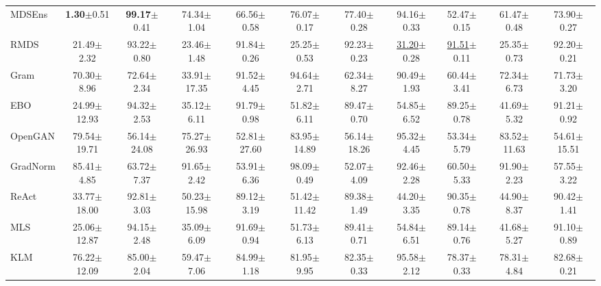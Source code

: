 \documentclass{article} \usepackage{iclr2024_conference,times}
\begin{document}
\begin{table*}[h]
{\begin{tabular}{l cc cc cc cc cc}
			MDSEns & \textbf{1.30}{\tiny$\pm$0.51} & \textbf{99.17}{\tiny$\pm$0.41} & 74.34{\tiny$\pm$1.04} & 66.56{\tiny$\pm$0.58} & 76.07{\tiny$\pm$0.17} & 77.40{\tiny$\pm$0.28} & 94.16{\tiny$\pm$0.33} & 52.47{\tiny$\pm$0.15} & 61.47{\tiny$\pm$0.48} & 73.90{\tiny$\pm$0.27} \\ 
			RMDS & 21.49{\tiny$\pm$2.32} & 93.22{\tiny$\pm$0.80} & 23.46{\tiny$\pm$1.48} & 91.84{\tiny$\pm$0.26} & 25.25{\tiny$\pm$0.53} & 92.23{\tiny$\pm$0.23} & \underline{31.20}{\tiny$\pm$0.28} & \underline{91.51}{\tiny$\pm$0.11} & 25.35{\tiny$\pm$0.73} & 92.20{\tiny$\pm$0.21} \\ 
			Gram & 70.30{\tiny$\pm$8.96} & 72.64{\tiny$\pm$2.34} & 33.91{\tiny$\pm$17.35} & 91.52{\tiny$\pm$4.45} & 94.64{\tiny$\pm$2.71} & 62.34{\tiny$\pm$8.27} & 90.49{\tiny$\pm$1.93} & 60.44{\tiny$\pm$3.41} & 72.34{\tiny$\pm$6.73} & 71.73{\tiny$\pm$3.20} \\ 
			EBO & 24.99{\tiny$\pm$12.93} & 94.32{\tiny$\pm$2.53} & 35.12{\tiny$\pm$6.11} & 91.79{\tiny$\pm$0.98} & 51.82{\tiny$\pm$6.11} & 89.47{\tiny$\pm$0.70} & 54.85{\tiny$\pm$6.52} & 89.25{\tiny$\pm$0.78} & 41.69{\tiny$\pm$5.32} & 91.21{\tiny$\pm$0.92} \\ 
			OpenGAN & 79.54{\tiny$\pm$19.71} & 56.14{\tiny$\pm$24.08} & 75.27{\tiny$\pm$26.93} & 52.81{\tiny$\pm$27.60} & 83.95{\tiny$\pm$14.89} & 56.14{\tiny$\pm$18.26} & 95.32{\tiny$\pm$4.45} & 53.34{\tiny$\pm$5.79} & 83.52{\tiny$\pm$11.63} & 54.61{\tiny$\pm$15.51} \\ 
			GradNorm & 85.41{\tiny$\pm$4.85} & 63.72{\tiny$\pm$7.37} & 91.65{\tiny$\pm$2.42} & 53.91{\tiny$\pm$6.36} & 98.09{\tiny$\pm$0.49} & 52.07{\tiny$\pm$4.09} & 92.46{\tiny$\pm$2.28} & 60.50{\tiny$\pm$5.33} & 91.90{\tiny$\pm$2.23} & 57.55{\tiny$\pm$3.22} \\ 
			ReAct & 33.77{\tiny$\pm$18.00} & 92.81{\tiny$\pm$3.03} & 50.23{\tiny$\pm$15.98} & 89.12{\tiny$\pm$3.19} & 51.42{\tiny$\pm$11.42} & 89.38{\tiny$\pm$1.49} & 44.20{\tiny$\pm$3.35} & 90.35{\tiny$\pm$0.78} & 44.90{\tiny$\pm$8.37} & 90.42{\tiny$\pm$1.41} \\ 
			MLS & 25.06{\tiny$\pm$12.87} & 94.15{\tiny$\pm$2.48} & 35.09{\tiny$\pm$6.09} & 91.69{\tiny$\pm$0.94} & 51.73{\tiny$\pm$6.13} & 89.41{\tiny$\pm$0.71} & 54.84{\tiny$\pm$6.51} & 89.14{\tiny$\pm$0.76} & 41.68{\tiny$\pm$5.27} & 91.10{\tiny$\pm$0.89} \\ 
			KLM & 76.22{\tiny$\pm$12.09} & 85.00{\tiny$\pm$2.04} & 59.47{\tiny$\pm$7.06} & 84.99{\tiny$\pm$1.18} & 81.95{\tiny$\pm$9.95} & 82.35{\tiny$\pm$0.33} & 95.58{\tiny$\pm$2.12} & 78.37{\tiny$\pm$0.33} & 78.31{\tiny$\pm$4.84} & 82.68{\tiny$\pm$0.21} \\ 

\end{tabular}}
\end{table*}
\end{document}
